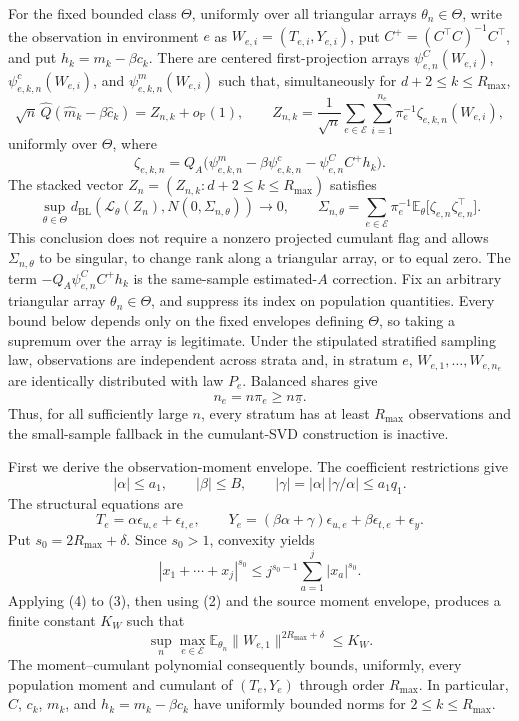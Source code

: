 For the fixed bounded class \(\Theta\), uniformly over all triangular arrays \(\theta_n\in\Theta\), write the observation in environment \(e\) as \(W_{e,i}=(T_{e,i},Y_{e,i})\), put \(C^+=(C^\top C)^{-1}C^\top\), and put \(h_k=m_k-\beta c_k\).  There are centered first-projection arrays \(\psi^C_{e,n}(W_{e,i})\), \(\psi^c_{e,k,n}(W_{e,i})\), and \(\psi^m_{e,k,n}(W_{e,i})\) such that, simultaneously for \(d+2\leq k\leq R_{\max}\),
\[
 \sqrt n\,\widehat Q(\widehat m_k-\beta\widehat c_k)
 =Z_{n,k}+o_{\mathbb P}(1),
 \qquad
 Z_{n,k}=\frac1{\sqrt n}\sum_{e\in\mathcal E}\sum_{i=1}^{n_e}\pi_e^{-1}\zeta_{e,k,n}(W_{e,i}),
\]
uniformly over \(\Theta\), where
\[
 \zeta_{e,k,n}
 =Q_A\bigl(\psi^m_{e,k,n}-\beta\psi^c_{e,k,n}
       -\psi^C_{e,n}C^+h_k\bigr).
\]
The stacked vector \(Z_n=(Z_{n,k}:d+2\leq k\leq R_{\max})\) satisfies
\[
 \sup_{\theta\in\Theta}
 d_{\mathrm{BL}}\!\left(\mathcal L_\theta(Z_n),N(0,\Sigma_{n,\theta})\right)\longrightarrow0,
 \qquad
 \Sigma_{n,\theta}=\sum_{e\in\mathcal E}\pi_e^{-1}
 \mathbb E_\theta\bigl[\zeta_{e,n}\zeta_{e,n}^{\top}\bigr].
\]
This conclusion does not require a nonzero projected cumulant flag and allows \(\Sigma_{n,\theta}\) to be singular, to change rank along a triangular array, or to equal zero.  The term \(-Q_A\psi^C_{e,n}C^+h_k\) is the same-sample estimated-\(A\) correction.
Fix an arbitrary triangular array \(\theta_n\in\Theta\), and suppress its index on population quantities.  Every bound below depends only on the fixed envelopes defining \(\Theta\), so taking a supremum over the array is legitimate.  Under the stipulated stratified sampling law, observations are independent across strata and, in stratum \(e\), \(W_{e,1},\ldots,W_{e,n_e}\) are identically distributed with law \(P_e\).  Balanced shares give
\[
 n_e=n\pi_e\geq n\underline\pi. \tag{1}
\]
Thus, for all sufficiently large \(n\), every stratum has at least \(R_{\max}\) observations and the small-sample fallback in the cumulant-SVD construction is inactive.

First we derive the observation-moment envelope.  The coefficient restrictions give
\[
 |\alpha|\leq a_1,
 \qquad |\beta|\leq B,
 \qquad |\gamma|=|\alpha|\,|\gamma/\alpha|\leq a_1q_1. \tag{2}
\]
The structural equations are
\[
 T_e=\alpha\epsilon_{u,e}+\epsilon_{t,e},
 \qquad
 Y_e=(\beta\alpha+\gamma)\epsilon_{u,e}
      +\beta\epsilon_{t,e}+\epsilon_y. \tag{3}
\]
Put \(s_0=2R_{\max}+\delta\).  Since \(s_0>1\), convexity yields
\[
 |x_1+\cdots+x_j|^{s_0}
 \leq j^{s_0-1}\sum_{a=1}^j|x_a|^{s_0}. \tag{4}
\]
Applying (4) to (3), then using (2) and the source moment envelope, produces a finite constant \(K_W\) such that
\[
 \sup_{n}\max_{e\in\mathcal E}
 \mathbb E_{\theta_n}\|W_{e,1}\|^{2R_{\max}+\delta}
 \leq K_W. \tag{5}
\]
The moment--cumulant polynomial consequently bounds, uniformly, every population moment and cumulant of \((T_e,Y_e)\) through order \(R_{\max}\).  In particular, \(C\), \(c_k\), \(m_k\), and \(h_k=m_k-\beta c_k\) have uniformly bounded norms for \(2\leq k\leq R_{\max}\).

